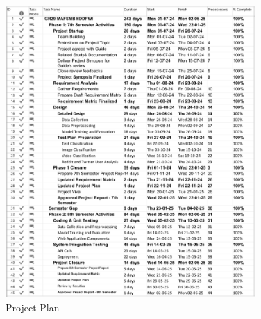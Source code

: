 \begin{figure}[H]  
    \centering
    \includegraphics[width=0.85\textwidth]{Images/MS Project Plan Sem 7.png}  
    \caption{Project Plan}
    \label{Project Plan}  %
\end{figure}

\pagebreak

